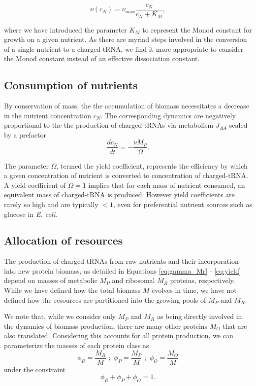 \begin{equation}
\nu(c_N) = \nu_{max}\frac{c_N}{c_N + K_M}, \label{eq:nu_cN}
\end{equation}

where we have introduced the parameter $K_M$ to represent the Monod constant for 
growth on a given nutrient. As there are myriad steps involved in the conversion of 
a single nutrient to a charged-tRNA, we find it more appropriate to consider the Monod 
constant instead of an effective dissociation constant.  

\subsection*{Consumption of nutrients}
By conservation of mass, the the accumulation of biomass necessitates a
decrease in the nutrient concentration $c_N$. The corresponding dynamics are negatively 
proportional to the the production of charged-tRNAs via metabolism $J_{AA}$ scaled by 
a prefactor
\begin{equation}
\frac{d c_N}{dt} = - \frac{\nu M_P}{\Omega}. \label{eq:yield}
\end{equation}

The parameter $\Omega$, termed the yield coefficient, represents the efficiency 
by which a given concentration of nutrient is converted to concentration of charged-tRNA. A
yield coefficient of $\Omega = 1$ implies that for each mass of nutrient consumed, an equivalent 
mass of charged-tRNA is produced. However yield coefficients are rarely so high and 
are typically $< 1$, even for preferential nutrient sources such as glucose in \textit{E. coli}.

\subsection*{Allocation of resources}
The production of charged-tRNAs from raw nutrients and their incorporation into 
new protein biomass, as detailed in Equations \ref{eq:gamma_Mr} - \ref{eq:yield} 
depend on masses of metabolic $M_P$ and ribosomal $M_R$ proteins, respectively. 
While we have defined how the total biomass $M$ evolves in time, we have not 
defined how the resources are partitioned into the growing pools of $M_P$ and $M_R$.

We note that, while we consider only $M_P$ and $M_R$ as being directly involved 
in the dynamics of biomass production, there are many other proteins $M_O$ that 
are also translated. Considering this accounts for all protein production, 
we can parameterize the masses of each protein class as 
\begin{equation}
\phi_R = \frac{M_R}{M}\,\,;\,\,\phi_P=\frac{M_P}{M}\,\,;\,\,\phi_O = \frac{M_O}{M} \label{eq:mass_frac_definition}
\end{equation}
under the constraint
\begin{equation}
    \phi_R + \phi_P + \phi_O = 1 \label{eq:frac_constraint}. 
\end{equation}

